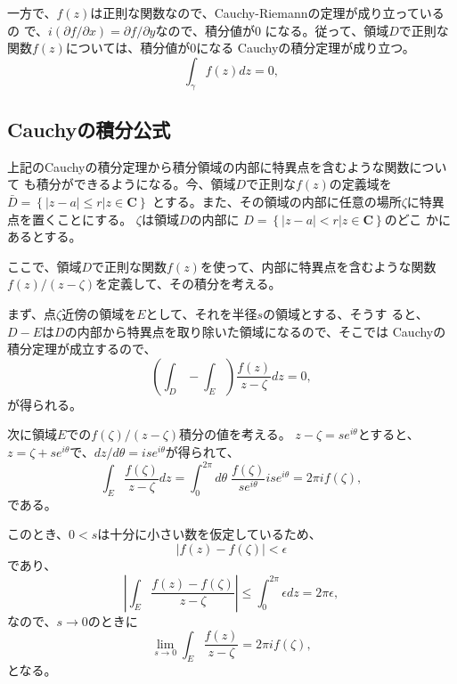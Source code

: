 一方で、$f(z)$は正則な関数なので、Cauchy-Riemannの定理が成り立っているの
で、$i(\partial f/\partial x) = \partial f/\partial y$なので、積分値が0
になる。従って、領域$D$で正則な関数$f(z)$については、積分値が0になる
Cauchyの積分定理が成り立つ。
\begin{equation}
 \int_{\gamma} f(z)dz = 0,
\end{equation}

\subsection{Cauchyの積分公式}
上記のCauchyの積分定理から積分領域の内部に特異点を含むような関数について
も積分ができるようになる。今、領域$D$で正則な$f(z)$の定義域を
$\bar{D}=\left\{\left|z-a\right|\leq r\left|\right.z\in\mathbf{C}\right\}$
とする。また、その領域の内部に任意の場所$\zeta$に特異点を置くことにする。
$\zeta$は領域$D$の内部に
$D=\left\{\left|z-a\right|< r\left|\right.z\in\mathbf{C}\right\}$のどこ
かにあるとする。

ここで、領域$D$で正則な関数$f(z)$を使って、内部に特異点を含むような関数
$f(z)/(z-\zeta)$を定義して、その積分を考える。

まず、点$\zeta$近傍の領域を$E$として、それを半径$s$の領域とする、そうす
ると、$D-E$は$D$の内部から特異点を取り除いた領域になるので、そこでは
Cauchyの積分定理が成立するので、
\begin{equation}
 \left(\int_{D}-\int_{E}\right)\frac{f(z)}{z-\zeta}dz = 0,
\end{equation}
が得られる。

次に領域$E$での$f(\zeta)/(z-\zeta)$積分の値を考える。
$z-\zeta = s e^{i\theta}$とすると、
$z=\zeta + s e^{i\theta}$で、$dz/d\theta = ise^{i\theta}$が得られて、
\begin{equation}
 \int_{E}\frac{f(\zeta)}{z-\zeta}dz
  = \int_{0}^{2\pi}d\theta\mspace{5mu}
  \frac{f(\zeta)}{se^{i\theta}}ise^{i\theta}
  = 2\pi i f(\zeta),
\end{equation}
である。

このとき、$0<s$は十分に小さい数を仮定しているため、
\begin{equation}
 \left|f(z) - f(\zeta)\right| < \epsilon
\end{equation}
であり、
\begin{equation}
 \left|\int_E\frac{f(z) - f(\zeta)}{z - \zeta}\right| 
  \leq \int_{0}^{2\pi}\epsilon dz
  = 2\pi \epsilon,
\end{equation}
なので、$s\to 0$のときに
\begin{equation}
 \lim_{s\to 0}\int_E\frac{f(z)}{z - \zeta} = 2\pi i f(\zeta),
\end{equation}
 となる。

